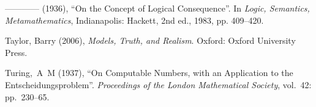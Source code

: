 \documentclass[openany,leqno,11pt]{book}
\theoremstyle{break}
\theoremstyle{definition}
\theoremstyle{remark}
\begin{document}
{\begin{thebibliography}{39}
---\!\!---\!\!---\!\!--- (1936), \enquote{On the Concept of Logical Consequence}. 
  In \emph{Logic, Semantics, Metamathematics}, Indianapolis: Hackett, 2nd ed., 1983, pp. 409–420.



Taylor, Barry (2006), \emph{Models, Truth, and Realism}. Oxford: Oxford
  University Press.

Turing,~A~M (1937), \enquote{On Computable Numbers, with an Application to
  the Entscheidungsproblem}. \emph{Proceedings of the London Mathematical
  Society}, vol.~42: pp.~230–65.

\end{thebibliography}
}






	
\end{document}
